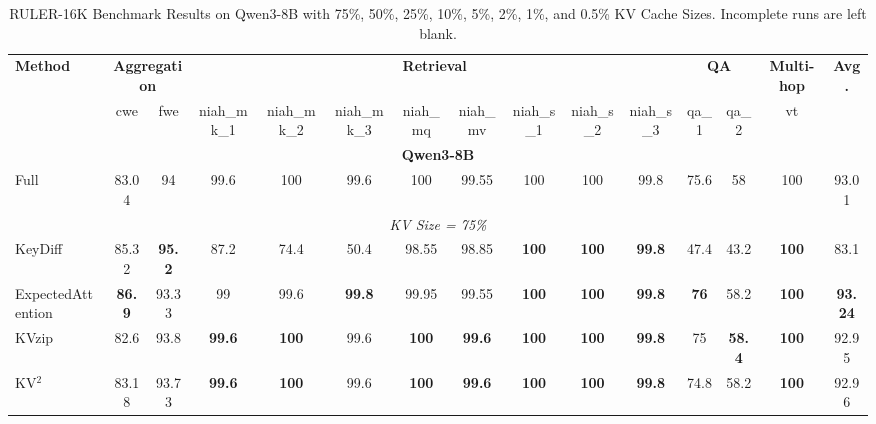 \documentclass[11pt]{article}
\begin{document}
\pagestyle{empty}

\begin{table}[htbp]
\centering
\caption{RULER-16K Benchmark Results on Qwen3-8B with 75\%, 50\%, 25\%, 10\%, 5\%, 2\%, 1\%, and 0.5\% KV Cache Sizes. Incomplete runs are left blank.}
\label{tab:ruler_16k_results}
\small
\setlength{\tabcolsep}{4pt}
\renewcommand{\arraystretch}{1.2}

\begin{tabular}{l|cc|cccccccc|cc|c|c}
\toprule
\multirow{2}{*}{\textbf{Method}}
    & \multicolumn{2}{c|}{\textbf{Aggregation}}
    & \multicolumn{8}{c|}{\textbf{Retrieval}}
    & \multicolumn{2}{c|}{\textbf{QA}}
    & \textbf{Multi-hop}
    & \multirow{2}{*}{\textbf{Avg.}} \\
\cmidrule(lr){2-3} \cmidrule(lr){4-11} \cmidrule(lr){12-13} \cmidrule(lr){14-14}
    & cwe & fwe
    & niah\_mk\_1 & niah\_mk\_2 & niah\_mk\_3
    & niah\_mq & niah\_mv
    & niah\_s\_1 & niah\_s\_2 & niah\_s\_3
    & qa\_1 & qa\_2
    & vt
    & \\
\midrule

\multicolumn{15}{c}{\textbf{Qwen3-8B}} \\
\midrule

Full
    & 83.04 & 94
    & 99.6 & 100 & 99.6
    & 100 & 99.55
    & 100 & 100 & 99.8
    & 75.6 & 58
    & 100
    & 93.01 \\

\midrule
\multicolumn{15}{c}{\textit{KV Size = 75\%}} \\
\midrule

KeyDiff
    & 85.32 & \textbf{95.2}
    & 87.2 & 74.4 & 50.4
    & 98.55 & 98.85
    & \textbf{100} & \textbf{100} & \textbf{99.8}
    & 47.4 & 43.2
    & \textbf{100}
    & 83.1 \\

ExpectedAttention
    & \textbf{86.9} & 93.33
    & 99 & 99.6 & \textbf{99.8}
    & 99.95 & 99.55
    & \textbf{100} & \textbf{100} & \textbf{99.8}
    & \textbf{76} & 58.2
    & \textbf{100}
    & \textbf{93.24} \\

KVzip
    & 82.6 & 93.8
    & \textbf{99.6} & \textbf{100} & 99.6
    & \textbf{100} & \textbf{99.6}
    & \textbf{100} & \textbf{100} & \textbf{99.8}
    & 75 & \textbf{58.4}
    & \textbf{100}
    & 92.95 \\

KV$^2$
    & 83.18 & 93.73
    & \textbf{99.6} & \textbf{100} & 99.6
    & \textbf{100} & \textbf{99.6}
    & \textbf{100} & \textbf{100} & \textbf{99.8}
    & 74.8 & 58.2
    & \textbf{100}
    & 92.96 \\


\end{tabular}
\end{table}
\end{document}
